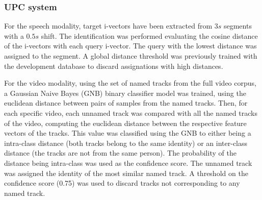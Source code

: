\subsubsection{UPC system}

For the speech modality, target i-vectors have been extracted from $3s$ segments with a $0.5s$ shift. The identification was performed evaluating the cosine distance of the i-vectors with each query i-vector. The query with the lowest distance was assigned to the segment. A global distance threshold was previously trained with the development database to discard assignations with high distances.

For the video modality, using the set of named tracks from the full video corpus, a Gaussian Naive Bayes (GNB) binary classifier model was trained, using the euclidean distance between pairs of samples from the named tracks. Then, for each specific video, each unnamed track was compared with all the named tracks of the video, computing the euclidean distance between the respective feature vectors of the tracks. This value was classified using the GNB to either being a intra-class distance (both tracks belong to the same identity) or an inter-class distance (the tracks are not from the same person). The probability of the distance being intra-class was used as the confidence score. The unnamed track was assigned the identity of the most similar named track. A threshold on the confidence score (0.75) was used to discard tracks not corresponding to any named track.
